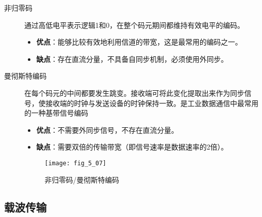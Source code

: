 \begin{description}
  \item[非归零码] 通过高低电平表示逻辑1和0，在整个码元期间都维持有效电平的编码。

\begin{itemize}
  \item
\textbf{优点}：能够比较有效地利用信道的带宽，这是最常用的编码之一。
  \item
\textbf{缺点}：存在直流分量，不具备自同步机制，必须使用外同步。
\end{itemize}

  \item[曼彻斯特编码] 在每个码元的中间都要发生跳变。接收端可将此变化提取出来作为同步信号，使接收端的时钟与发送设备的时钟保持一致。是工业数据通信中最常用的一种基带信号编码

\begin{itemize}
  \item \textbf{优点}：不需要外同步信号，不存在直流分量。
  \item \textbf{缺点}：需要双倍的传输带宽（即信号速率是数据速率的2倍）。
\end{itemize}

\begin{center}
\begin{figure}
  \centering
  \texttt{[image: fig\_5\_07]}\\
  \caption{非归零码/曼彻斯特编码}\label{fig_5_07}
\end{figure}
\end{center}


\end{description}


\subsection{载波传输}

